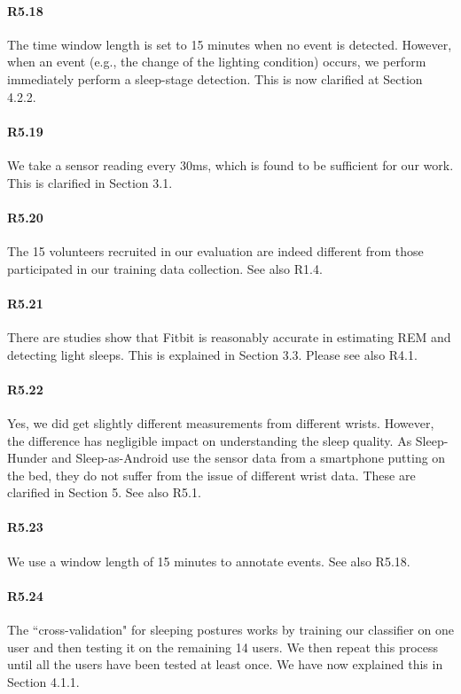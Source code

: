 \paragraph{R5.18} The time window length is set to 15 minutes when no event is detected. However, when an event (e.g., the change of the
lighting condition) occurs, we perform immediately perform a sleep-stage detection. This is now clarified at Section 4.2.2.

\paragraph{R5.19} We take a sensor reading every 30ms, which is found to be sufficient for our work. This is clarified in Section 3.1.

\paragraph{R5.20} The 15 volunteers recruited in our evaluation are indeed different from those participated in our training data collection. See also R1.4.

\paragraph{R5.21} There are studies show that Fitbit is reasonably accurate in estimating REM and detecting light sleeps. This is explained in Section 3.3.
Please see also R4.1.

\paragraph{R5.22} Yes, we did get slightly different measurements from different wrists. However, the difference has negligible impact on
understanding the sleep quality. As Sleep-Hunder and Sleep-as-Android use the sensor data from a smartphone putting on the bed, they do not
suffer from the issue of different wrist data. These are clarified in Section 5. See also R5.1.


\paragraph{R5.23} We use a window length of 15 minutes to annotate events. See also R5.18.

\paragraph{R5.24} The ``cross-validation" for sleeping postures works by training our classifier on one user and then testing it on the
remaining 14 users. We then repeat this process until all the users have been tested at least once. We have now explained this in Section
4.1.1.



